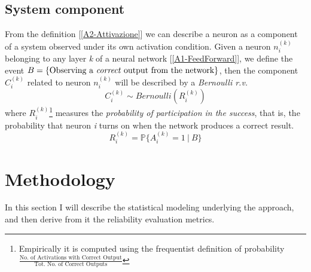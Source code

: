 \documentclass[10pt]{article} %
\begin{document}
\subsection{System component}
\label{A3-Component}
From the definition [\ref{A2-Attivazione}] we can describe a neuron as a component of a system observed under its own activation condition. Given a neuron $n^{(k)}_{i}$ belonging to any layer \textit{k} of a neural network [\ref{A1-FeedForward}], we define the event $B = \{\text{Observing a \textit{correct} output from the network}\}$, then the component $C^{(k)}_{i}$ related to neuron $n^{(k)}_{i}$ will be described by a \textit{Bernoulli r.v.}
\begin{equation} 
    C^{(k)}_{i} \sim Bernoulli(R^{(k)}_{i})
\end{equation}
where $R^{(k)}_{i}$\footnote{Empirically it is computed using the frequentist definition of probability $\frac{\mbox{No. of Activations with Correct Output}}{\mbox{Tot. No. of Correct Outputs}}$}
measures the \textit{probability of participation in the success}, that is, the probability that neuron \textit{i} turns on when the network produces a correct result.
\begin{equation}
    R^{(k)}_{i} = \mathbb{P}\{A^{(k)}_{i} = 1\ |\ B\}
\end{equation}

\section{Methodology}
\label{A5-k-outof-}
In this section I will describe the statistical modeling underlying the approach, and then derive from it the reliability evaluation metrics.  
\end{document}
